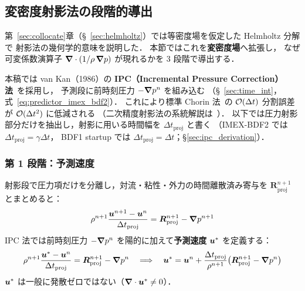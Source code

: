 \subsection{変密度射影法の段階的導出}
\label{sec:projection_derivation}

第~\ref{sec:collocate}章（§~\ref{sec:helmholtz}）では等密度場を仮定した Helmholtz 分解で
射影法の幾何学的意味を説明した．
本節ではこれを\textbf{変密度場}へ拡張し，
なぜ可変係数演算子 $\bm{\nabla}\cdot(1/\rho\,\bm{\nabla} p)$ が現れるかを 3 段階で導出する．

本稿では van Kan（1986）の \textbf{IPC（Incremental Pressure Correction）法}~\cite{vanKan1986}を採用し，
予測段に前時刻圧力 $-\bm{\nabla} p^n$ を組み込む
（§~\ref{sec:time_int}，式~\eqref{eq:predictor_imex_bdf2}）．
これにより標準 Chorin 法~\cite{Chorin1968}の $\mathcal{O}(\Delta t)$ 分割誤差が $\mathcal{O}(\Delta t^2)$ に低減される
（二次精度射影法の系統解説は~\cite{BellColella1989,Guermond2006}）．
以下では圧力射影部分だけを抽出し，射影に用いる時間幅を
$\Delta t_{\mathrm{proj}}$ と書く
（IMEX-BDF2 では $\Delta t_{\mathrm{proj}}=\gamma\Delta t$，
BDF1 startup では $\Delta t_{\mathrm{proj}}=\Delta t$；§\ref{sec:ipc_derivation}）．

\subsubsection{第 1 段階：予測速度}

射影段で圧力項だけを分離し，対流・粘性・外力の時間離散済み寄与を
$\bm{R}_{\mathrm{proj}}^{n+1}$ とまとめると：
\begin{equation}
  \rho^{n+1}\frac{\bm{u}^{n+1} - \bm{u}^n}{\Delta t_{\mathrm{proj}}}
  = \bm{R}_{\mathrm{proj}}^{n+1}
  - \bm{\nabla} p^{n+1}
  \label{eq:NS_full}
\end{equation}
IPC 法では前時刻圧力 $-\bm{\nabla} p^n$ を陽的に加えて\textbf{予測速度} $\bm{u}^*$ を定義する：
\begin{equation}
  \rho^{n+1}\frac{\bm{u}^* - \bm{u}^n}{\Delta t_{\mathrm{proj}}}
  = \bm{R}_{\mathrm{proj}}^{n+1} - \bm{\nabla} p^n
  \quad\Longrightarrow\quad
  \bm{u}^* = \bm{u}^n
  + \frac{\Delta t_{\mathrm{proj}}}{\rho^{n+1}}
    \bigl(\bm{R}_{\mathrm{proj}}^{n+1} - \bm{\nabla} p^n\bigr)
  \label{eq:predictor}
\end{equation}
$\bm{u}^*$ は一般に発散ゼロではない（$\bm{\nabla}\cdot\bm{u}^* \neq 0$）．


